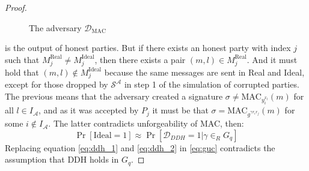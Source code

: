 \documentclass{acm_proc_article-sp}
\begin{document}
\begin{proof}
\begin{figure}
\caption{The adversary $\mathcal{D}_\mathrm{MAC}$}
\label{adv:mac}
\end{figure}

is the output of honest parties. But if there exists an honest party with index $j$ such that $M_j^\mathrm{Real} \neq M_j^\mathrm{Ideal}$,
then there exists a pair $(m, l) \in M_j^\mathrm{Real}$. And it must hold that $(m, l) \notin M_j^\mathrm{Ideal}$ because the
same messages are sent in Real and Ideal, except for those dropped by $\mathcal{S^A}$ in step 1 of the simulation of corrupted
parties. The previous means that the adversary created a signature $\sigma \neq \mathrm{MAC}_{y_i^{x_l}}(m)$ for all $l \in I_\mathcal{A}$,
and as it was accepted by $P_j$ it must be that $\sigma = \mathrm{MAC}_{g^{\gamma r_i r_j}}(m)$ for some $i \notin I_\mathcal{A}$.
The latter contradicts unforgeability of MAC, then:
\begin{equation}
\Pr[\mathrm{Ideal} = 1] \approx \Pr[\mathcal{D}_{DDH} = 1|\gamma \in_R G_q]
\label{eq:ddh_2}
\end{equation}
Replacing equation \ref{eq:ddh_1} and \ref{eq:ddh_2} in \ref{eq:guc} contradicts the assumption that DDH holds in $G_q$.
\end{proof}

%

%
%
\end{document}

